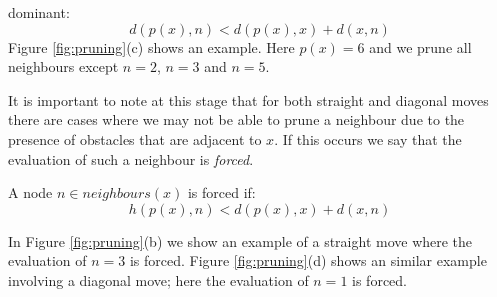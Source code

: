 dominant: 
\begin{equation}
d(p(x), n) < d(p(x), x) + d(x, n) 
\end{equation}
Figure \ref{fig:pruning}(c) shows an example. Here $p(x) = 6$ and we prune all
neighbours except $n = 2$, $n = 3$ and $n = 5$.  
\par
It is important to note at this stage that for both straight and diagonal moves
there are cases where we may not be able to prune a neighbour due to the
presence of obstacles that are adjacent to $x$.  If this occurs we say that the
evaluation of such a neighbour is \emph{forced}.

\begin{definition}
\label{def:forced}
A node $n \in neighbours(x)$ is forced if:
$$h(p(x), n) < d(p(x), x) + d(x, n)$$
\end{definition}
\par \noindent
In Figure \ref{fig:pruning}(b) we show an example of a straight move where 
the evaluation of $n = 3$ is forced. Figure \ref{fig:pruning}(d)  
shows an similar example involving a diagonal move; here the evaluation of
 $n = 1$ is forced. 
